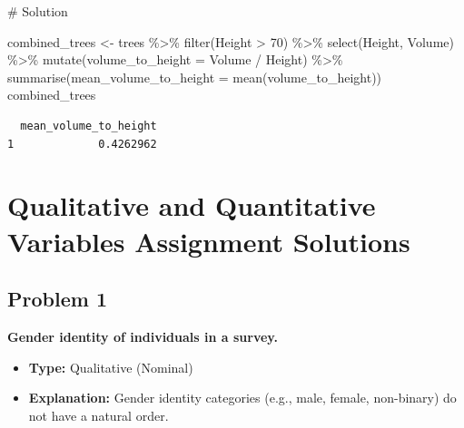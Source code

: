 \documentclass[
  letterpaper,
  DIV=11,
  numbers=noendperiod]{scrreprt}
\newenvironment{Shaded}{\begin{snugshade}}{\end{snugshade}}
\newcommand{\AttributeTok}[1]{\textcolor[rgb]{0.40,0.45,0.13}{#1}}
\newcommand{\CommentTok}[1]{\textcolor[rgb]{0.37,0.37,0.37}{#1}}
\newcommand{\DecValTok}[1]{\textcolor[rgb]{0.68,0.00,0.00}{#1}}
\newcommand{\FunctionTok}[1]{\textcolor[rgb]{0.28,0.35,0.67}{#1}}
\newcommand{\NormalTok}[1]{\textcolor[rgb]{0.00,0.23,0.31}{#1}}
\newcommand{\OtherTok}[1]{\textcolor[rgb]{0.00,0.23,0.31}{#1}}
\newcommand{\SpecialCharTok}[1]{\textcolor[rgb]{0.37,0.37,0.37}{#1}}
\begin{document}
\begin{Shaded}
\begin{Highlighting}[]
\CommentTok{\# Solution}


\NormalTok{combined\_trees }\OtherTok{\textless{}{-}}\NormalTok{ trees }\SpecialCharTok{\%\textgreater{}\%}
  \FunctionTok{filter}\NormalTok{(Height }\SpecialCharTok{\textgreater{}} \DecValTok{70}\NormalTok{) }\SpecialCharTok{\%\textgreater{}\%}
  \FunctionTok{select}\NormalTok{(Height, Volume) }\SpecialCharTok{\%\textgreater{}\%}
  \FunctionTok{mutate}\NormalTok{(}\AttributeTok{volume\_to\_height =}\NormalTok{ Volume }\SpecialCharTok{/}\NormalTok{ Height) }\SpecialCharTok{\%\textgreater{}\%}
  \FunctionTok{summarise}\NormalTok{(}\AttributeTok{mean\_volume\_to\_height =} \FunctionTok{mean}\NormalTok{(volume\_to\_height))}
\NormalTok{combined\_trees}
\end{Highlighting}
\end{Shaded}

\begin{verbatim}
  mean_volume_to_height
1             0.4262962
\end{verbatim}

\cleardoublepage
{}
{}
\appendix

\chapter*{Qualitative and Quantitative Variables Assignment
Solutions}\label{qualitative-and-quantitative-variables-assignment-solutions}


\section*{Problem 1}\label{problem-1-2}


\textbf{Gender identity of individuals in a survey.}

\begin{itemize}
\item
  \textbf{Type:} Qualitative (Nominal)
\item
  \textbf{Explanation:} Gender identity categories (e.g., male, female,
  non-binary) do not have a natural order.
\end{itemize}
\end{document}
